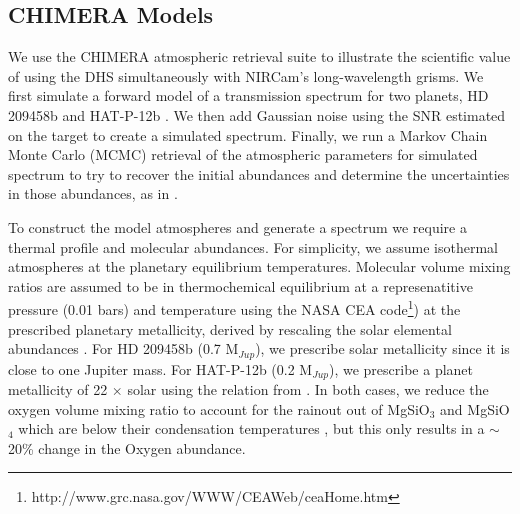 \documentclass[iop]{emulateapj}
\begin{document}
\subsection{CHIMERA Models}\label{sec:models}


We use the CHIMERA atmospheric retrieval suite \citep{line2013chimera,line2014CtOsecE} to illustrate the scientific value of using the DHS simultaneously with NIRCam's long-wavelength grisms.
We first simulate a forward model of a transmission spectrum for two planets, HD 209458b \citep{henry00,charbonneau00} and HAT-P-12b \citep{hartman2009hatp12}.
We then add Gaussian noise using the SNR estimated on the target to create a simulated spectrum.
Finally, we run a Markov Chain Monte Carlo (MCMC) retrieval of the atmospheric parameters for simulated spectrum to try to recover the initial abundances and determine the uncertainties in those abundances, as in \citet{greene2016jwst_trans}.



To construct the model atmospheres and generate a spectrum we require a thermal profile and molecular abundances. For simplicity, we assume isothermal atmospheres at the planetary equilibrium temperatures. Molecular volume mixing ratios are assumed to be in thermochemical equilibrium at a represenatitive pressure (0.01 bars) and temperature using the NASA CEA code\footnote{http://www.grc.nasa.gov/WWW/CEAWeb/ceaHome.htm}\citep{gordon1996cea}) at the prescribed planetary metallicity, derived by rescaling the solar elemental abundances \citep{asplund}.
For HD 209458b (0.7 M$_{Jup}$), we prescribe solar metallicity since it is close to one Jupiter mass.
For HAT-P-12b (0.2 M$_{Jup}$), we prescribe a planet metallicity of 22 $\times$ solar using the relation from \citet{kreidberg2014wasp43}.
In both cases, we reduce the oxygen volume mixing ratio to account for the rainout out of MgSiO$_3$ and MgSiO$_4$ which are below their condensation temperatures \citep{sing2016continuum}, but this only results in a $\sim$ 20\% change in the Oxygen abundance.
\end{document}
